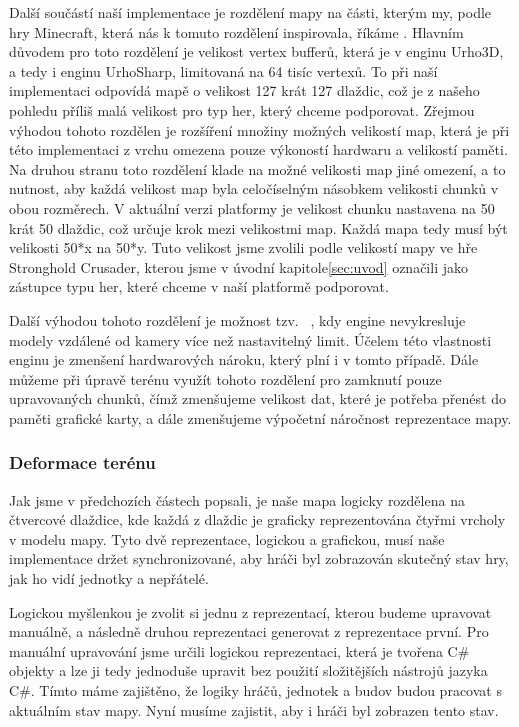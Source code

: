 Další součástí naší implementace je rozdělení mapy na části, kterým my, podle hry Minecraft, která nás k tomuto rozdělení inspirovala, říkáme  . Hlavním důvodem pro toto rozdělení je velikost vertex bufferů, která je v enginu Urho3D, a tedy i enginu UrhoSharp, limitovaná na 64 tisíc vertexů. To při naší implementaci odpovídá mapě o velikost 127 krát 127 dlaždic, což je z našeho pohledu příliš malá velikost pro typ her, který chceme podporovat. Zřejmou výhodou tohoto rozdělen je rozšíření množiny možných velikostí map, která je při této implementaci z vrchu omezena pouze výkoností hardwaru a velikostí paměti. Na druhou stranu toto rozdělení klade na možné velikosti map jiné omezení, a to nutnost, aby každá velikost map byla celočíselným násobkem velikosti chunků v obou rozměrech. V aktuální verzi platformy je velikost chunku nastavena na 50 krát 50 dlaždic, což určuje krok mezi velikostmi map. Každá mapa tedy musí být velikosti 50*x na 50*y. Tuto velikost jsme zvolili podle velikostí mapy ve hře Stronghold Crusader, kterou jsme v úvodní kapitole\ref{sec:uvod} označili jako zástupce typu her, které chceme v naší platformě podporovat.

Další výhodou tohoto rozdělení je možnost tzv.~ , kdy engine nevykresluje modely vzdálené od kamery více než nastavitelný limit. Účelem této vlastnosti enginu je zmenšení hardwarových nároku, který plní i v tomto případě. Dále můžeme při úpravě terénu využít tohoto rozdělení pro zamknutí pouze upravovaných chunků, čímž zmenšujeme velikost dat, které je potřeba přenést do paměti grafické karty, a dále zmenšujeme výpočetní náročnost reprezentace mapy.

\subsubsection{Deformace terénu}
Jak jsme v předchozích částech popsali, je naše mapa logicky rozdělena na čtvercové dlaždice, kde každá z dlaždic je graficky reprezentována čtyřmi vrcholy v modelu mapy. Tyto dvě reprezentace, logickou a grafickou, musí naše implementace držet synchronizované, aby hráči byl zobrazován skutečný stav hry, jak ho vidí jednotky a nepřátelé. 

Logickou myšlenkou je zvolit si jednu z reprezentací, kterou budeme upravovat manuálně, a následně druhou reprezentaci generovat z reprezentace první. Pro manuální upravování jsme určili logickou reprezentaci, která je tvořena C\# objekty a lze ji tedy jednoduše upravit bez použití složitějších nástrojů jazyka C\#. Tímto máme zajištěno, že logiky hráčů, jednotek a budov budou pracovat s aktuálním stav mapy. Nyní musíme zajistit, aby i hráči byl zobrazen tento stav.

